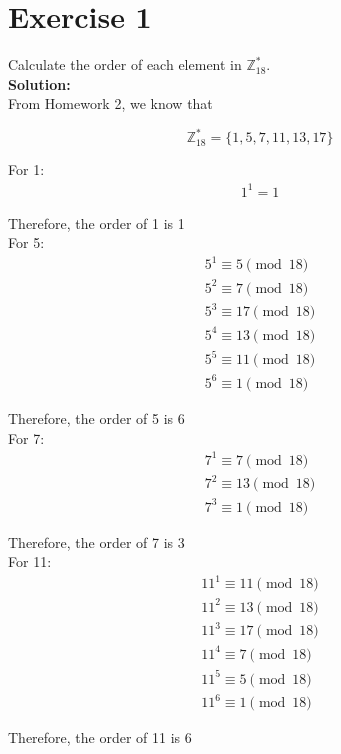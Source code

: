 \documentclass{article}
\begin{document}
\section*{Exercise 1}
Calculate the order of each element in $\mathbb{Z}_{18}^*$. \\

\textbf{Solution:} \\

From Homework 2, we know that

$$\mathbb{Z}_{18}^* = \{1, 5, 7, 11, 13, 17\}$$

For 1:
\begin{align*}
   1^1 = 1
\end{align*}

Therefore, the order of 1 is 1 \\

For 5:
\begin{align*}
   5^1 \equiv 5 \pmod{18} \\
   5^2 \equiv 7 \pmod{18} \\
   5^3 \equiv 17 \pmod{18} \\
   5^4 \equiv 13 \pmod{18} \\
   5^5 \equiv 11 \pmod{18} \\
   5^6 \equiv 1 \pmod{18}
\end{align*}

Therefore, the order of 5 is 6 \\

For 7:
\begin{align*}
   7^1 \equiv 7 \pmod{18} \\
   7^2 \equiv 13 \pmod{18} \\
   7^3 \equiv 1 \pmod{18}
\end{align*}

Therefore, the order of 7 is 3 \\

For 11:
\begin{align*}
   11^1 \equiv 11 \pmod{18} \\
   11^2 \equiv 13 \pmod{18} \\
   11^3 \equiv 17 \pmod{18} \\
   11^4 \equiv 7 \pmod{18} \\
   11^5 \equiv 5 \pmod{18} \\
   11^6 \equiv 1 \pmod{18}
\end{align*}

Therefore, the order of 11 is 6 \\
\end{document}

